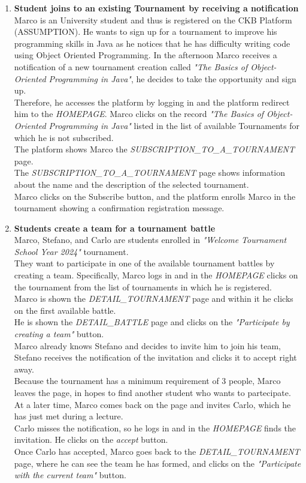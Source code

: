 \begin{enumerate}
	\item \textbf{Student joins to an existing Tournament by receiving a notification}\\
	      Marco is an University student and thus is registered on the CKB Platform (ASSUMPTION). He wants to sign up for a tournament to improve his programming skills in Java as he notices that he has difficulty writing code using Object Oriented Programming. In the afternoon Marco receives a notification of a new tournament creation called \emph{"The Basics of Object-Oriented Programming in Java"}, he decides to take the opportunity and sign up.\\
	      Therefore, he accesses the platform by logging in and the platform redirect him to the \emph{HOMEPAGE}. Marco clicks on the record \emph{"The Basics of Object-Oriented Programming in Java"} listed in the list of available Tournaments for which he is not subscribed.\\
	      The platform shows Marco the \emph{SUBSCRIPTION\_TO\_A\_TOURNAMENT} page.\\
	      The \emph{SUBSCRIPTION\_TO\_A\_TOURNAMENT}  page shows information about the name and the description of the selected tournament. \\
	      Marco clicks on the Subscribe button, and the platform enrolls Marco in the tournament showing a confirmation registration message.

	\item \textbf{Students create a team for a tournament battle}\\
	      Marco, Stefano, and Carlo are students enrolled in \emph{"Welcome Tournament School Year 2024"} tournament.\\
	      They want to participate in one of the available tournament battles by creating a team.
	      Specifically, Marco logs in and in the \emph{HOMEPAGE} clicks on the tournament from the list of tournaments in which he is registered.\\
	      Marco is shown the \emph{DETAIL\_TOURNAMENT} page and within it he clicks on the first available battle.\\
	      He is shown the \emph{DETAIL\_BATTLE} page and clicks on the \emph{"Participate by creating a team"} button.\\
	      Marco already knows Stefano and decides to invite him to join his team, Stefano receives the notification of the invitation and
	      clicks it to accept right away.\\
	      Because the tournament has a minimum requirement of 3 people, Marco leaves the page, in hopes to find another student who wants to partecipate.\\
	      At a later time, Marco comes back on the page and invites Carlo, which he has just met during a lecture.\\
	      Carlo misses the notification, so he logs in and in the \emph{HOMEPAGE} finds the invitation. He clicks on the
	      \emph{accept} button.\\
	      Once Carlo has accepted, Marco goes back to the \emph{DETAIL\_TOURNAMENT} page, where he can see the team he has formed,
	      and clicks on the \emph{"Participate with the current team"} button.


\end{enumerate}
